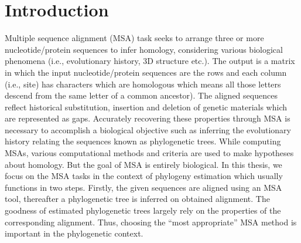\section{Introduction}
\label{sec:introducntion}
Multiple sequence alignment (MSA) task seeks to arrange three or more nucleotide/protein sequences to infer homology, considering various biological phenomena (i.e., evolutionary history, 3D structure etc.). The output is a matrix in which the input nucleotide/protein sequences are the rows and each column (i.e., site) has characters which are homologous which means all those letters descend from the same letter of a common ancestor). The aligned sequences reflect historical substitution, insertion and deletion of genetic materials which are represented as gaps. Accurately recovering these properties through MSA is necessary to accomplish a biological objective such as inferring the evolutionary history relating the sequences known as phylogenetic trees. While computing MSAs, various computational methods and criteria are used to make hypotheses about homology. But the goal of MSA is entirely biological. %
%
%
In this thesis, we focus on the MSA tasks in the context of phylogeny estimation which usually functions in two steps. Firstly, the given sequences are aligned using an MSA tool, thereafter a phylogenetic tree is inferred on obtained alignment. The goodness of estimated phylogenetic trees largely rely on the properties of the corresponding alignment. Thus, choosing the ``most appropriate'' MSA method  is important in the phylogenetic context.

